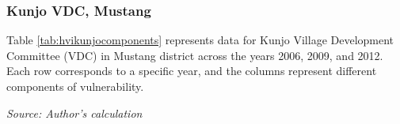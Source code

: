 \subsubsection{Kunjo VDC, Mustang}
Table \ref{tab:hvikunjocomponents} represents data for Kunjo Village Development Committee (VDC) in Mustang district across the years 2006, 2009, and 2012. Each row corresponds to a specific year, and the columns represent different components of vulnerability.
\begin{table}[ht]
	\caption{Mean of the HVI components for Kunjo VDC, Mustang}
	\textit{Source: Author's calculation}
	\label{tab:hvikunjocomponents}
\end{table}

